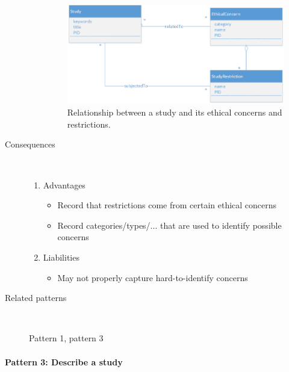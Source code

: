 \documentclass[10pt]{article}
\begin{document}
\begin{description}
\begin{enumerate}
\begin{figure}[t]
\centering
	\includegraphics[width=1\textwidth]{img/identifyworkflows.png}
	\caption{Relationship between a study and its ethical concerns and restrictions.}
	\label{pat2cd1}
\end{figure}

	\end{enumerate}

	\item[Consequences]~\par
		\begin{enumerate}
			\item Advantages
			\begin{itemize}
				\item Record that restrictions come from certain ethical concerns
				\item Record categories/types/... that are used to identify possible concerns
			\end{itemize}
			\item Liabilities
			\begin{itemize}
				\item May not properly capture hard-to-identify concerns

			\end{itemize}
		\end{enumerate}
		

	\item[Related patterns]~\par
		Pattern 1, pattern 3
\end{description}

\paragraph{Pattern 3: Describe a study}
\end{document}

